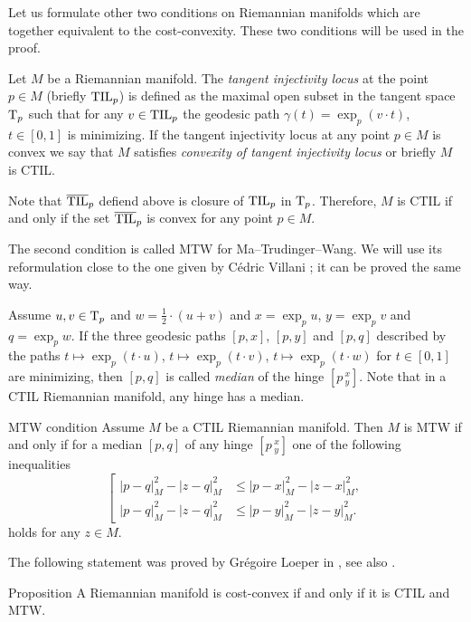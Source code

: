 Let us formulate other two conditions on Riemannian manifolds which are together equivalent to the cost-convexity.
These two conditions will be used in the proof.

Let $M$ be a Riemannian manifold.
The \emph{tangent injectivity locus} at the point $p\in M$ (briefly $\mathrm{\rm TIL}_p$) is defined as the maximal open subset in the tangent space $\mathrm{T}_p$ such that for any $v\in\mathrm{\rm TIL}_p$ the geodesic path $\gamma(t)=\exp_p(v\cdot t)$, $t\in [0,1]$ is minimizing.
If the tangent injectivity locus at any point $p\in M$ is convex we say that $M$ satisfies \emph{convexity of  tangent injectivity locus} or briefly $M$ is CTIL.

Note that $\overline{\mathrm{\rm TIL}}_p$ defiend above is closure of $\mathrm{\rm TIL}_p$ in $\mathrm{T}_p$.
Therefore, $M$ is CTIL if and only if the set $\overline{\mathrm{\rm TIL}}_p$ is convex for any point $p\in M$.

The second condition is called MTW for Ma--Trudinger--Wang.
We will use its reformulation close to the one given by Cédric Villani \cite[2.6]{MTW+CTIL}; it can be proved the same way.

Assume $u,v\in \mathrm{T}_p$ and $w=\tfrac12\cdot(u+v)$
and $x=\exp_p u$, $y=\exp_pv$ and $q=\exp_pw$.
If the three geodesic paths $[p,x]$, $[p,y]$ and $[p,q]$ described by the paths 
$t\mapsto\exp_p(t\cdot u)$,  $t\mapsto\exp_p(t\cdot v)$, $t\mapsto\exp_p(t\cdot w)$ for $t\in[0,1]$ are minimizing, then $[p,q]$ is called \emph{median} of the hinge $[p\,^x_y]$.
Note that in a CTIL Riemannian manifold, any hinge has a median.

\begin{thm}{MTW condition}\label{MTW}
Assume $M$ be a CTIL Riemannian manifold. 
Then $M$ is MTW if and only if for a median $[p,q]$ of any hinge $[p\,^x_y]$ one of the following inequalities
\[
\left[
\begin{aligned}
|p-q|^2_M-|z-q|^2_M&\le |p-x|^2_M-|z-x|^2_M,
\\
|p-q|^2_M-|z-q|^2_M&\le |p-y|^2_M-|z-y|^2_M.
\end{aligned}
\right.
\]
holds for any $z\in M$.
\end{thm}

The following statement was proved by Gr\'egoire Loeper in \cite{loeper}, see also \cite[Proposition 2.5]{MTW+CTIL}.

\begin{thm}{Proposition}
A Riemannian manifold is cost-convex if and only if it is CTIL and MTW. 
\end{thm}


